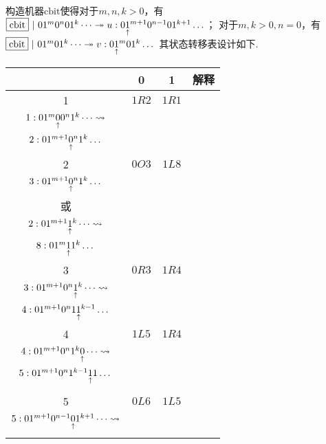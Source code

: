 \newcommand{\cbit}{\boxed{\mathrm{cbit}}}

\begin{pf} \rm 
    构造机器$\cbit$使得对于$m, n, k > 0$，有$\cbit\sepline01^m0^n01^k\dots\twoheadrightarrow u: 0 \pointer{1}^{m+1} 0^{n-1}01^{k+1}\dots$； 对于$m, k > 0, n = 0$，有$\cbit\sepline01^m01^k\dots\twoheadrightarrow v: 0 \pointer{1}^{m} 0 1^{k}\dots$ 其状态转移表设计如下. 
    \begin{center}
        \footnotesize
        \begin{tabular}{ |c|c|c|c| } 
        \hline
          & 0 & 1 & 解释 \\ 
         \hline
         1 & $1R2$ & $1R1$ & \makecell{
             $1:0\pointer{1}^m0^n01^k\leadsto$\\
             $1:01^m \underset{\substack{\uparrow}}{0} 0^n 1^k\dots\leadsto$\\
             $2: 01^{m+1} \underset{\substack{\uparrow}}{0}^n 1^k\dots $} 
        \\ \hline
         2 & $0O3$ & $1L8$ & \makecell{
            $2: 01^{m+1} \pointer{0}^n 1^k\dots \leadsto$ \\ 
            $3: 01^{m+1} \underset{\substack{\uparrow}}{0}^n 1^k\dots $ \\ 
            或 \\
            $2: 01^{m+1} \underset{\substack{\uparrow}}{1}^k\dots \leadsto$ \\ 
            $8: 01^{m} \underset{\substack{\uparrow}}{1} 1^k\dots $
        } 
        \\  \hline
        3 & $0R3$ & $1R4$ & \makecell{
            $3: 01^{m+1} \pointer{0}^n 1^k\dots \leadsto$ \\
            $3: 01^{m+1} 0^n \underset{\substack{\uparrow}}{1}^k\dots \leadsto$ \\ 
            $4: 01^{m+1} 0^n 1\underset{\substack{\uparrow}}{1}^{k-1}\dots$ 
        } 
        \\  \hline
        4 & $1L5$ & $1R4$ & \makecell{
            $4: 01^{m+1} 0^n 1\pointer{1}^{k-1}\dots\leadsto$\\ 
            $4: 01^{m+1} 0^n 1^k\underset{\substack{\uparrow}}{0}\dots\leadsto$\\ 
            $5: 01^{m+1} 0^n 1^{k-1}\underset{\substack{\uparrow}}{1}1\dots$\\ 
        } 
        \\  \hline
        5 & $0L6$ & $1L5$ & \makecell{
            $5: 01^{m+1} 0^n 1^{k-1}\pointer{1}1\dots\leadsto$\\ 
            $5: 01^{m+1} 0^{n-1}\underset{\substack{\uparrow}}{0} 1^{k+1}\dots\leadsto$\\
}
\end{tabular}
\end{center}
\end{pf}
